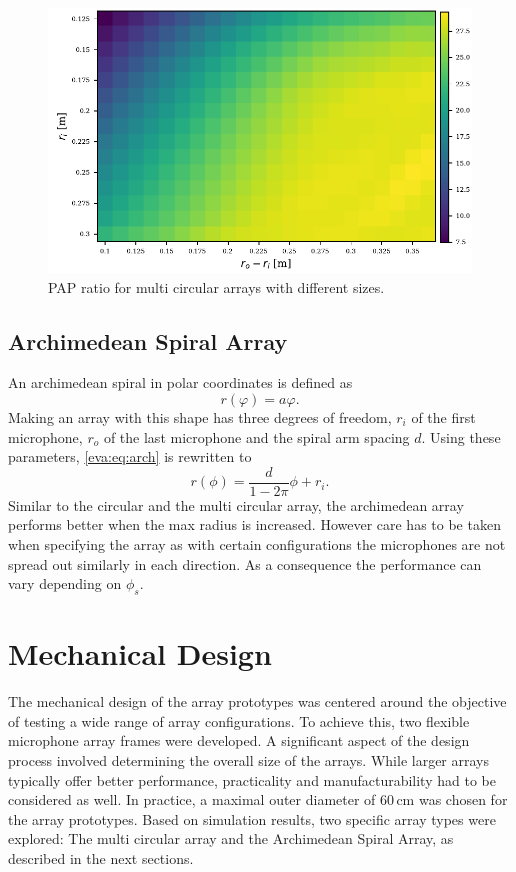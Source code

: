 \newpage
\begin{figure}[ht]
	\centering
	\includegraphics[]{images/5_array_evaluation/fancy_pap.pdf}
	\caption{PAP ratio for multi circular arrays with different
		sizes.}
	\label{aev:fig:FancyPap}
\end{figure}


\subsection{Archimedean Spiral Array}
An archimedean spiral in polar coordinates is defined as
\begin{equation}
	\label{eva:eq:arch}
	r(\varphi) = a \varphi.
\end{equation}
Making an array with this shape has three degrees of freedom,
$r_i$ of the first microphone, $r_o$ of the last microphone and the
spiral arm spacing $d$.
Using these parameters, \eqref{eva:eq:arch} is rewritten to
\begin{equation}
	r(\phi) = \frac{d}{1 - 2\pi} \phi + r_i.
\end{equation}
Similar to the circular and the multi circular array,
the archimedean array performs better when the max
radius is increased.
However care has to be taken when specifying the array
as with certain configurations the microphones are not
spread out similarly in each direction.
As a consequence the performance can vary depending
on $\phi_s$.

\newpage
\section{Mechanical Design}
The mechanical design of the array prototypes was centered around the objective of testing a wide range of array configurations.
To achieve this, two flexible microphone array frames were developed.
A significant aspect of the design process involved determining the overall size of the arrays.
While larger arrays typically offer better performance, practicality and manufacturability had to be considered as well.
In practice, a maximal outer diameter of 60\,cm was chosen for the array prototypes.
Based on simulation results, two specific array types were explored: The multi circular array and the Archimedean Spiral Array, as described in the next sections.


